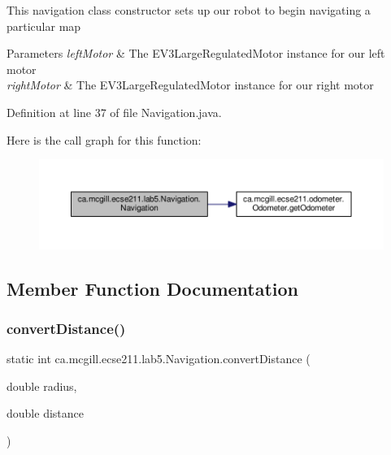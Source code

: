 This navigation class constructor sets up our robot to begin navigating a particular map


\begin{DoxyParams}{Parameters}
{\em left\+Motor} & The E\+V3\+Large\+Regulated\+Motor instance for our left motor \\
\hline
{\em right\+Motor} & The E\+V3\+Large\+Regulated\+Motor instance for our right motor \\
\hline
\end{DoxyParams}


Definition at line 37 of file Navigation.\+java.

Here is the call graph for this function\+:
\nopagebreak
\begin{figure}[H]
\begin{center}
\leavevmode
\includegraphics[width=350pt]{classca_1_1mcgill_1_1ecse211_1_1lab5_1_1_navigation_a93b746f61226c3b14532c43d0c2f61dd_cgraph}
\end{center}
\end{figure}


\subsection{Member Function Documentation}
\mbox{\label{classca_1_1mcgill_1_1ecse211_1_1lab5_1_1_navigation_a85122ad723d0988c118866f367073be6}} 
\subsubsection{\texorpdfstring{convert\+Distance()}{convertDistance()}}
{\footnotesize\ttfamily static int ca.\+mcgill.\+ecse211.\+lab5.\+Navigation.\+convert\+Distance (\begin{DoxyParamCaption}\item[{double}]{radius,  }\item[{double}]{distance }\end{DoxyParamCaption})\hspace{0.3cm}{\ttfamily [static]}}


